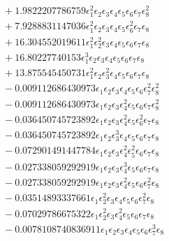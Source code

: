 \documentclass[10pt]{article}
\begin{document}
\begin{align*}
&{}  + 1.9822207786759 \epsilon_{1}^{2} \epsilon_{2} \epsilon_{3} \epsilon_{4} \epsilon_{5} \epsilon_{6} \epsilon_{7} \epsilon_{8}^{2} \\
&{}  + 7.9288831147036 \epsilon_{1}^{2} \epsilon_{2} \epsilon_{3} \epsilon_{4} \epsilon_{5} \epsilon_{6}^{2} \epsilon_{7} \epsilon_{8} \\
&{}  + 16.304552019611 \epsilon_{1}^{2} \epsilon_{2}^{2} \epsilon_{3} \epsilon_{4} \epsilon_{5} \epsilon_{6} \epsilon_{7} \epsilon_{8} \\
&{}  + 16.80227740153 \epsilon_{1}^{3} \epsilon_{2} \epsilon_{3} \epsilon_{4} \epsilon_{5} \epsilon_{6} \epsilon_{7} \epsilon_{8} \\
&{}  + 13.875545450731 \epsilon_{1}^{2} \epsilon_{2} \epsilon_{3}^{2} \epsilon_{4} \epsilon_{5} \epsilon_{6} \epsilon_{7} \epsilon_{8} \\
&{}  - 0.009112686430973 \epsilon_{1} \epsilon_{2} \epsilon_{3} \epsilon_{4} \epsilon_{5} \epsilon_{6} \epsilon_{7}^{2} \epsilon_{8}^{2} \\
&{}  - 0.009112686430973 \epsilon_{1} \epsilon_{2} \epsilon_{3} \epsilon_{4}^{2} \epsilon_{5} \epsilon_{6} \epsilon_{7} \epsilon_{8}^{2} \\
&{}  - 0.036450745723892 \epsilon_{1} \epsilon_{2} \epsilon_{3} \epsilon_{4}^{2} \epsilon_{5} \epsilon_{6}^{2} \epsilon_{7} \epsilon_{8} \\
&{}  - 0.036450745723892 \epsilon_{1} \epsilon_{2} \epsilon_{3}^{3} \epsilon_{4} \epsilon_{5} \epsilon_{6} \epsilon_{7} \epsilon_{8} \\
&{}  - 0.072901491447784 \epsilon_{1} \epsilon_{2} \epsilon_{3} \epsilon_{4}^{2} \epsilon_{5}^{2} \epsilon_{6} \epsilon_{7} \epsilon_{8} \\
&{}  - 0.027338059292919 \epsilon_{1} \epsilon_{2} \epsilon_{3} \epsilon_{4}^{3} \epsilon_{5} \epsilon_{6} \epsilon_{7} \epsilon_{8} \\
&{}  - 0.027338059292919 \epsilon_{1} \epsilon_{2} \epsilon_{3} \epsilon_{4}^{2} \epsilon_{5} \epsilon_{6} \epsilon_{7}^{2} \epsilon_{8} \\
&{}  - 0.03514893337661 \epsilon_{1} \epsilon_{2}^{2} \epsilon_{3} \epsilon_{4} \epsilon_{5} \epsilon_{6} \epsilon_{7}^{2} \epsilon_{8} \\
&{}  - 0.07029786675322 \epsilon_{1} \epsilon_{2}^{2} \epsilon_{3} \epsilon_{4}^{2} \epsilon_{5} \epsilon_{6} \epsilon_{7} \epsilon_{8} \\
&{}  - 0.0078108740836911 \epsilon_{1} \epsilon_{2} \epsilon_{3} \epsilon_{4} \epsilon_{5} \epsilon_{6} \epsilon_{7}^{3} \epsilon_{8} \\

\end{align*}
\end{document}
